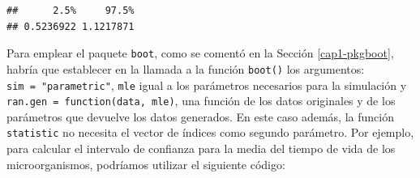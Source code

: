 \documentclass[]{book}
\newenvironment{Shaded}{\begin{snugshade}}{\end{snugshade}}
\newcommand{\KeywordTok}[1]{\textcolor[rgb]{0.13,0.29,0.53}{\textbf{#1}}}
\newcommand{\DecValTok}[1]{\textcolor[rgb]{0.00,0.00,0.81}{#1}}
\newcommand{\StringTok}[1]{\textcolor[rgb]{0.31,0.60,0.02}{#1}}
\newcommand{\CommentTok}[1]{\textcolor[rgb]{0.56,0.35,0.01}{\textit{#1}}}
\newcommand{\OperatorTok}[1]{\textcolor[rgb]{0.81,0.36,0.00}{\textbf{#1}}}
\newcommand{\NormalTok}[1]{#1}
\theoremstyle{definition}
\theoremstyle{definition}
\theoremstyle{definition}
\theoremstyle{remark}
\begin{document}
\begin{Shaded}
\end{Shaded}

\begin{verbatim}
##      2.5%     97.5% 
## 0.5236922 1.1217871
\end{verbatim}

Para emplear el paquete \texttt{boot}, como se comentó en la Sección
\ref{cap1-pkgboot}, habría que establecer en la llamada a la función
\texttt{boot()} los argumentos: \texttt{sim\ =\ "parametric"},
\texttt{mle} igual a los parámetros necesarios para la simulación y
\texttt{ran.gen\ =\ function(data,\ mle)}, una función de los datos
originales y de los parámetros que devuelve los datos generados. En este
caso además, la función \texttt{statistic} no necesita el vector de
índices como segundo parámetro. Por ejemplo, para calcular el intervalo
de confianza para la media del tiempo de vida de los microorganismos,
podríamos utilizar el siguiente código:
\end{document}
